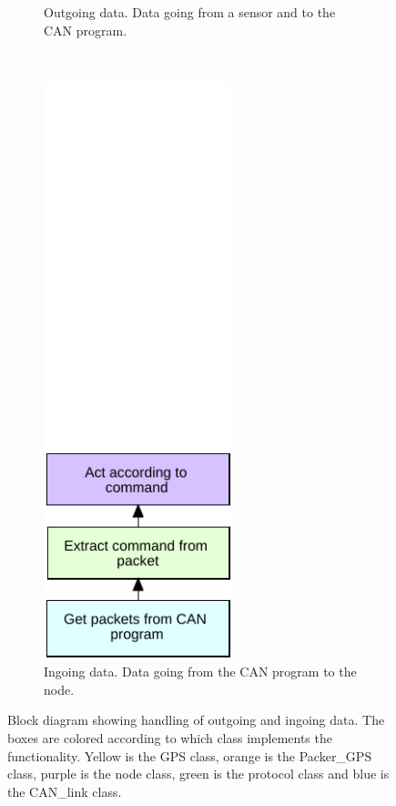 \begin{figure}[!h]
\begin{subfigure}{0.45\textwidth}
\caption{Outgoing data. Data going from a sensor and to the CAN program.}
\label{fig:filter_1}
\end{subfigure}
~
\begin{subfigure}{0.45\textwidth}
\centering
\includegraphics[width=0.60\textwidth]{graphics/FlowChart_Node_Unpacking}
\caption{Ingoing data. Data going from the CAN program to the node.}
\label{fig:filter_2}
\end{subfigure}
\caption{Block diagram showing handling of outgoing and ingoing data. The boxes are colored according to which class implements the functionality. Yellow is the GPS class, orange is the Packer\_GPS class, purple is the node class, green is the protocol class and blue is the CAN\_link class.}
\label{fig:flow_flow}
\end{figure}

